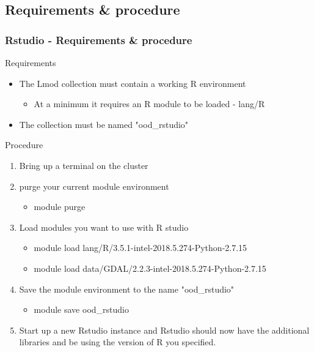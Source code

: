 \subsection[rstudioenv]{Requirements \& procedure}
\begin{frame}
	\frametitle{Rstudio - Requirements \& procedure}
	\begin{block}{Requirements}
		\begin{itemize}
			\item The Lmod collection must contain a working R environment
				\begin{itemize}
					\item At a minimum it requires an R module to be loaded - lang/R
				\end{itemize}
			\item The collection must be named "ood\_rstudio"
		\end{itemize}
	\end{block}
	\begin{block}{Procedure}
		\begin{enumerate}
			\item Bring up a terminal on the cluster
			\item purge your current module environment
				\begin{itemize}
				\item module purge
				\end{itemize}
			\item Load modules you want to use with R studio
				\begin{itemize}
				\item module load lang/R/3.5.1-intel-2018.5.274-Python-2.7.15 
				\item module load data/GDAL/2.2.3-intel-2018.5.274-Python-2.7.15
				\end{itemize}
			\item Save the module environment to the name "ood\_rstudio"
				\begin{itemize}
				\item module save ood\_rstudio
				\end{itemize}
			\item Start up a new Rstudio instance and Rstudio should now have the additional libraries and be using the version of R you specified.
		\end{enumerate}
	\end{block}
\end{frame}


